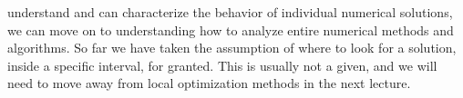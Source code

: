 
 understand and can characterize the behavior of individual numerical solutions, 
we can move on to understanding how to analyze entire numerical methods and algorithms. So far we have taken the assumption of where to look for a solution, inside a specific interval, for granted.
This is usually not a given, and we will need to move away from local optimization methods in the next lecture. 




